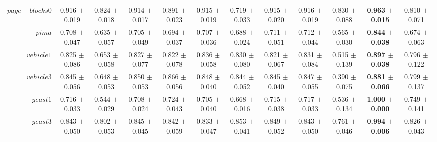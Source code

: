 \begin{table}[!ht]
{\begin{tabular}{r c c c c c c c c c c c}
$page-blocks0$ & 0.916 $\pm$ 0.019 & 0.824 $\pm$ 0.018 & 0.914 $\pm$ 0.017 & 0.891 $\pm$ 0.023 & 0.915 $\pm$ 0.019 & 0.719 $\pm$ 0.033 & 0.915 $\pm$ 0.020 & 0.916 $\pm$ 0.019 & 0.830 $\pm$ 0.088 & \textbf{0.963 $\pm$ 0.015} & 0.810 $\pm$ 0.071 \\
$pima$ & 0.708 $\pm$ 0.047 & 0.635 $\pm$ 0.057 & 0.705 $\pm$ 0.049 & 0.694 $\pm$ 0.037 & 0.707 $\pm$ 0.036 & 0.688 $\pm$ 0.024 & 0.711 $\pm$ 0.051 & 0.712 $\pm$ 0.044 & 0.565 $\pm$ 0.030 & \textbf{0.844 $\pm$ 0.038} & 0.674 $\pm$ 0.063 \\
$vehicle1$ & 0.825 $\pm$ 0.086 & 0.653 $\pm$ 0.058 & 0.827 $\pm$ 0.077 & 0.822 $\pm$ 0.078 & 0.836 $\pm$ 0.058 & 0.830 $\pm$ 0.080 & 0.821 $\pm$ 0.067 & 0.831 $\pm$ 0.084 & 0.515 $\pm$ 0.139 & \textbf{0.897 $\pm$ 0.038} & 0.796 $\pm$ 0.122 \\
$vehicle3$ & 0.845 $\pm$ 0.056 & 0.648 $\pm$ 0.053 & 0.850 $\pm$ 0.053 & 0.866 $\pm$ 0.056 & 0.848 $\pm$ 0.040 & 0.844 $\pm$ 0.052 & 0.845 $\pm$ 0.040 & 0.847 $\pm$ 0.055 & 0.390 $\pm$ 0.075 & \textbf{0.881 $\pm$ 0.066} & 0.799 $\pm$ 0.137 \\
$yeast1$ & 0.716 $\pm$ 0.033 & 0.544 $\pm$ 0.029 & 0.708 $\pm$ 0.024 & 0.724 $\pm$ 0.043 & 0.705 $\pm$ 0.040 & 0.668 $\pm$ 0.016 & 0.715 $\pm$ 0.038 & 0.717 $\pm$ 0.033 & 0.536 $\pm$ 0.134 & \textbf{1.000 $\pm$ 0.000} & 0.749 $\pm$ 0.141 \\
$yeast3$ & 0.843 $\pm$ 0.050 & 0.802 $\pm$ 0.053 & 0.845 $\pm$ 0.045 & 0.842 $\pm$ 0.059 & 0.833 $\pm$ 0.047 & 0.853 $\pm$ 0.041 & 0.849 $\pm$ 0.052 & 0.843 $\pm$ 0.050 & 0.761 $\pm$ 0.046 & \textbf{0.994 $\pm$ 0.006} & 0.826 $\pm$ 0.043 \\
\end{tabular}}
\end{table}
